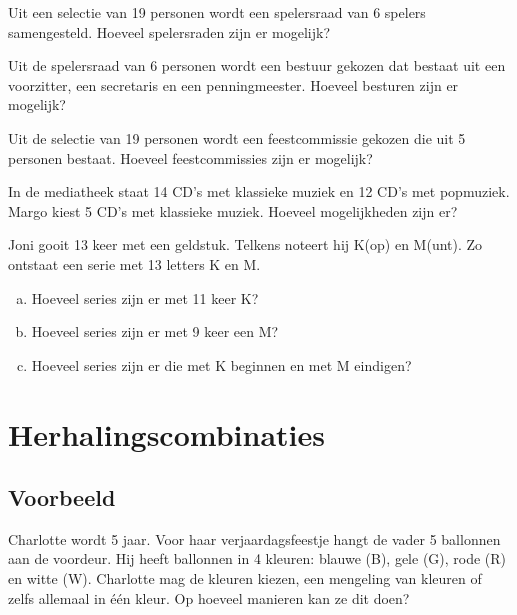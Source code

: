 \documentclass[12pt,a4,twoside]{article}
\begin{document}
\begin{oefening}
Uit een selectie van 19 personen wordt een spelersraad van 6 spelers samengesteld. Hoeveel spelersraden zijn er mogelijk?
\end{oefening}

\begin{oefening}
Uit de spelersraad van 6 personen wordt een bestuur gekozen dat bestaat uit een voorzitter, een secretaris en een penningmeester. Hoeveel besturen zijn er mogelijk?
\end{oefening}

\begin{oefening}
Uit de selectie van 19 personen wordt een feestcommissie gekozen die uit 5 personen bestaat. Hoeveel feestcommissies zijn er mogelijk?
\end{oefening}

\begin{oefening}
In de mediatheek staat 14 CD's met klassieke muziek en 12 CD's met popmuziek. Margo kiest 5 CD's met klassieke muziek. Hoeveel mogelijkheden zijn er?
\end{oefening}

\begin{oefening}
Joni gooit 13 keer met een geldstuk. Telkens noteert hij K(op) en M(unt). Zo ontstaat een serie met 13 letters K en M.
\begin{enumerate}[(a)]
  \item Hoeveel series zijn er met 11 keer K?
  \item Hoeveel series zijn er met 9 keer een M?
  \item Hoeveel series zijn er die met K beginnen en met M eindigen?
\end{enumerate}
\end{oefening}

\pagebreak
\section{Herhalingscombinaties}

\subsection{Voorbeeld}

Charlotte wordt 5 jaar. Voor haar verjaardagsfeestje hangt de vader 5 ballonnen aan de voordeur. Hij heeft ballonnen in 4 kleuren: blauwe (B), gele (G), rode (R) en witte (W). Charlotte mag de kleuren kiezen, een mengeling van kleuren of zelfs allemaal in één kleur. Op hoeveel manieren kan ze dit doen?
\end{document}

